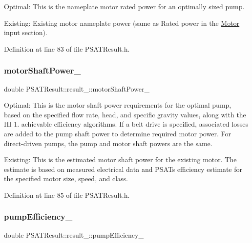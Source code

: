Optimal\+: This is the nameplate motor rated power for an optimally sized pump. 

Existing\+: Existing motor nameplate power (same as Rated power in the \hyperlink{class_motor}{Motor} input section). 

Definition at line 83 of file P\+S\+A\+T\+Result.\+h.

\mbox{\label{struct_p_s_a_t_result_1_1result___a323a0097e50cc796e105803f435f3f88}} 
\subsubsection{\texorpdfstring{motor\+Shaft\+Power\+\_\+}{motorShaftPower\_}}
{\footnotesize\ttfamily double P\+S\+A\+T\+Result\+::result\+\_\+\+::motor\+Shaft\+Power\+\_\+}



Optimal\+: This is the motor shaft power requirements for the optimal pump, based on the specified flow rate, head, and specific gravity values, along with the HI 1. achievable efficiency algorithms. If a belt drive is specified, associated losses are added to the pump shaft power to determine required motor power. For direct-\/driven pumps, the pump and motor shaft powers are the same. 

Existing\+: This is the estimated motor shaft power for the existing motor. The estimate is based on measured electrical data and P\+S\+AT\textquotesingle{}s efficiency estimate for the specified motor size, speed, and class. 

Definition at line 85 of file P\+S\+A\+T\+Result.\+h.

\mbox{\label{struct_p_s_a_t_result_1_1result___a0065022cdb7678fd08ac63d80de08f85}} 
\subsubsection{\texorpdfstring{pump\+Efficiency\+\_\+}{pumpEfficiency\_}}
{\footnotesize\ttfamily double P\+S\+A\+T\+Result\+::result\+\_\+\+::pump\+Efficiency\+\_\+}



